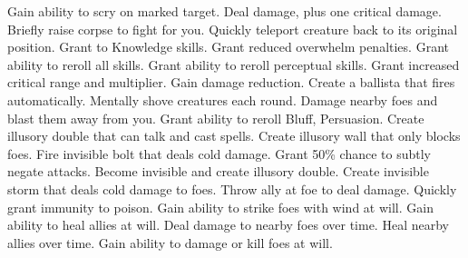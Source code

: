     {Gain ability to scry on marked target.}
    {Deal damage, plus one critical damage.}
    {Briefly raise corpse to fight for you.}
    {Quickly teleport creature back to its original position.}
    {Grant  to Knowledge skills.}
    {Grant reduced overwhelm penalties.}
    {Grant ability to reroll all skills.}
    {Grant ability to reroll perceptual skills.}
    {Grant increased critical range and multiplier.}
    {Gain damage reduction.}
    {Create a ballista that fires automatically.}
    {Mentally shove creatures each round.}
    {Damage nearby foes and blast them away from you.}
    {Grant ability to reroll Bluff, Persuasion.}
    {Create illusory double that can talk and cast spells.}
    {Create illusory wall that only blocks foes.}
    {Fire invisible bolt that deals cold damage.}
    {Grant 50\% chance to subtly negate attacks.}
    {Become invisible and create illusory double.}
    {Create invisible storm that deals cold damage to foes.}
    {Throw ally at foe to deal damage.}
    {Quickly grant immunity to poison.}
    {Gain ability to strike foes with wind at will.}
    {Gain ability to heal allies at will.}
    {Deal damage to nearby foes over time.}
    {Heal nearby allies over time.}
    {Gain ability to damage or kill foes at will.}
